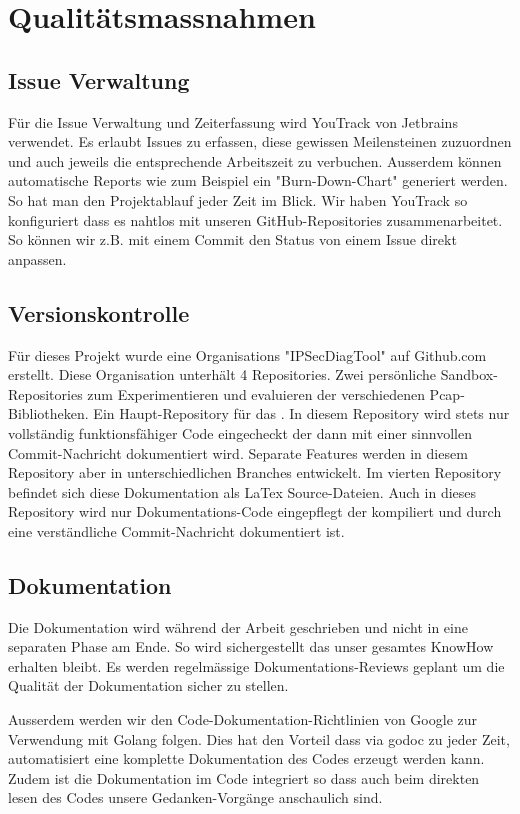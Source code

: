 \section{Qualitätsmassnahmen}
\label{sec:Qualitätsmassnahmen}

\subsection{Issue Verwaltung}
Für die Issue Verwaltung und Zeiterfassung wird YouTrack von Jetbrains verwendet. Es erlaubt Issues zu erfassen, diese gewissen Meilensteinen zuzuordnen und auch jeweils die entsprechende Arbeitszeit zu verbuchen. Ausserdem können automatische Reports wie zum Beispiel ein "Burn-Down-Chart" generiert werden. So hat man den Projektablauf jeder Zeit im Blick. Wir haben YouTrack so konfiguriert dass es nahtlos mit unseren GitHub-Repositories zusammenarbeitet. So können wir z.B. mit einem Commit den Status von einem Issue direkt anpassen.

\subsection{Versionskontrolle}
Für dieses Projekt wurde eine Organisations "IPSecDiagTool" auf Github.com erstellt. Diese Organisation unterhält 4 Repositories. Zwei persönliche Sandbox-Repositories zum Experimentieren und evaluieren der verschiedenen Pcap-Bibliotheken. Ein Haupt-Repository für das \tool . In diesem Repository wird stets nur vollständig funktionsfähiger Code eingecheckt der dann mit einer sinnvollen Commit-Nachricht dokumentiert wird. Separate Features werden in diesem Repository aber in unterschiedlichen Branches entwickelt.
Im vierten Repository befindet sich diese Dokumentation als LaTex Source-Dateien. Auch in dieses Repository wird nur Dokumentations-Code eingepflegt der kompiliert und durch eine verständliche Commit-Nachricht dokumentiert ist.

\subsection{Dokumentation}
Die Dokumentation wird während der Arbeit geschrieben und nicht in eine separaten Phase am Ende. So wird sichergestellt das unser gesamtes KnowHow erhalten bleibt.
Es werden regelmässige Dokumentations-Reviews geplant um die Qualität der Dokumentation sicher zu stellen.

Ausserdem werden wir den Code-Dokumentation-Richtlinien von Google zur Verwendung mit Golang folgen. Dies hat den Vorteil dass via godoc zu jeder Zeit, automatisiert eine komplette Dokumentation des Codes erzeugt werden kann. Zudem ist die Dokumentation im Code integriert so dass auch beim direkten lesen des Codes unsere Gedanken-Vorgänge anschaulich sind.

